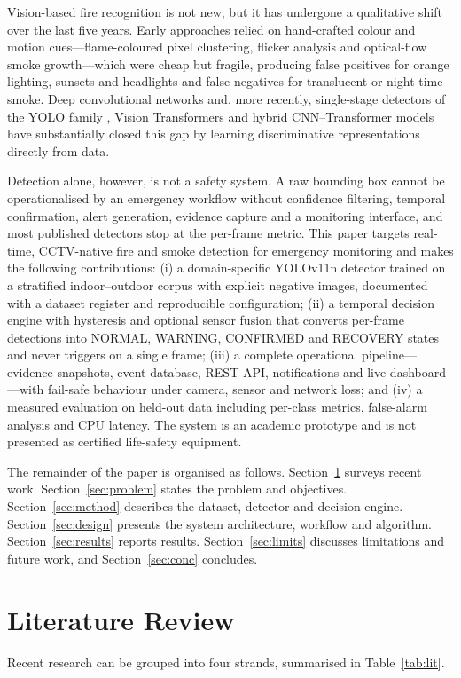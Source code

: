 \documentclass[conference]{IEEEtran}
\begin{document}
Vision-based fire recognition is not new, but it has undergone a qualitative shift over the last five years. Early approaches relied on hand-crafted colour and motion cues---flame-coloured pixel clustering, flicker analysis and optical-flow smoke growth---which were cheap but fragile, producing false positives for orange lighting, sunsets and headlights and false negatives for translucent or night-time smoke. Deep convolutional networks and, more recently, single-stage detectors of the YOLO family \cite{redmon2016yolo,jocher2023yolov8,khanam2024yolov11}, Vision Transformers \cite{dosovitskiy2021vit} and hybrid CNN--Transformer models have substantially closed this gap by learning discriminative representations directly from data.

Detection alone, however, is not a safety system. A raw bounding box cannot be operationalised by an emergency workflow without confidence filtering, temporal confirmation, alert generation, evidence capture and a monitoring interface, and most published detectors stop at the per-frame metric. This paper targets real-time, CCTV-native fire and smoke detection for emergency monitoring and makes the following contributions: (i) a domain-specific YOLOv11n detector trained on a stratified indoor--outdoor corpus with explicit negative images, documented with a dataset register and reproducible configuration; (ii) a temporal decision engine with hysteresis and optional sensor fusion that converts per-frame detections into NORMAL, WARNING, CONFIRMED and RECOVERY states and never triggers on a single frame; (iii) a complete operational pipeline---evidence snapshots, event database, REST API, notifications and live dashboard---with fail-safe behaviour under camera, sensor and network loss; and (iv) a measured evaluation on held-out data including per-class metrics, false-alarm analysis and CPU latency. The system is an academic prototype and is not presented as certified life-safety equipment.

The remainder of the paper is organised as follows. Section~\ref{sec:lit} surveys recent work. Section~\ref{sec:problem} states the problem and objectives. Section~\ref{sec:method} describes the dataset, detector and decision engine. Section~\ref{sec:design} presents the system architecture, workflow and algorithm. Section~\ref{sec:results} reports results. Section~\ref{sec:limits} discusses limitations and future work, and Section~\ref{sec:conc} concludes.

\section{Literature Review}\label{sec:lit}
Recent research can be grouped into four strands, summarised in Table~\ref{tab:lit}.
\end{document}
